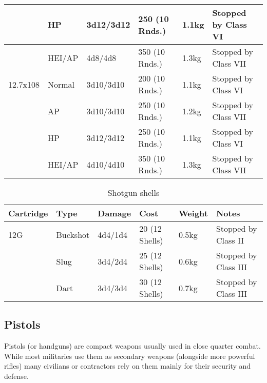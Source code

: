 \begin{table}
\begin{center}
\begin{tabular}{| l | l | l | l | l | l |}
      \,       & HP      & 3d12/3d12  & 250 (10 Rnds.) & 1.1kg & Stopped by Class VI \\ \hline
      \,       & HEI/AP  & 4d8/4d8    & 350 (10 Rnds.) & 1.3kg & Stopped by Class VII \\ \hline
      12.7x108 & Normal  & 3d10/3d10  & 200 (10 Rnds.) & 1.1kg & Stopped by Class VI \\ \hline
      \,       & AP      & 3d10/3d10  & 250 (10 Rnds.) & 1.2kg & Stopped by Class VII \\ \hline
      \,       & HP      & 3d12/3d12  & 250 (10 Rnds.) & 1.1kg & Stopped by Class VI \\ \hline
      \,       & HEI/AP  & 4d10/4d10  & 350 (10 Rnds.) & 1.3kg & Stopped by Class VII \\ \hline

    \end{tabular}
  \end{center}
\end{table}

\begin{table}
  \caption{Shotgun shells}
  \label{tab:ShotgunShells}
  \begin{center}
    \begin{tabular}{| l | l | l | l | l | l |}
      \hline
      \textbf{Cartridge}  & \textbf{Type}   & \textbf{Damage} &
      \textbf{Cost} & \textbf{Weight} & \textbf{Notes}        \\ \hline

      12G     & Buckshot & 4d4/1d4 & 20 (12 Shells) & 0.5kg & Stopped by Class II \\ \hline
      \,      & Slug     & 3d4/2d4 & 25 (12 Shells) & 0.6kg & Stopped by Class III \\ \hline
      \,      & Dart     & 3d4/3d4 & 30 (12 Shells) & 0.7kg & Stopped by Class III \\ \hline

    \end{tabular}
  \end{center}
\end{table}

\subsection{Pistols}

Pistols (or handguns) are compact weapons usually used in close quarter combat.
While most militaries use them as secondary weapons (alongside more powerful
rifles) many civilians or contractors rely on them mainly for their security
and defense.

